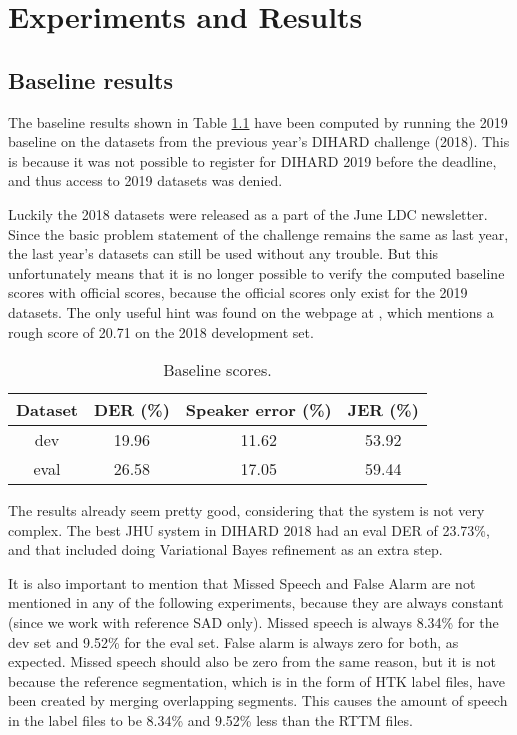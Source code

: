 \chapter{Experiments and Results}

	\section{Baseline results}
	The baseline results shown in Table \ref{table-baseline-scores} have been computed by running the 2019 baseline on the datasets from the previous year's DIHARD challenge (2018). This is because it was not possible to register for DIHARD 2019 before the deadline, and thus access to 2019 datasets was denied.
	
	Luckily the 2018 datasets were released as a part of the June LDC newsletter. Since the basic problem statement of the challenge remains the same as last year, the last year's datasets can still be used without any trouble. But this unfortunately means that it is no longer possible to verify the computed baseline scores with official scores, because the official scores only exist for the 2019 datasets. The only useful hint was found on the webpage at \cite{dihard2-unofficial}, which mentions a rough score of 20.71 on the 2018 development set.
	
	\begin{table}[h]
		\centering
		\begin{tabular}{|c|c|c|c|}
			\hline
			Dataset & DER (\%) & Speaker error (\%) & JER (\%) \\
			\hline
			dev & 19.96 & 11.62 & 53.92 \\
			\hline
			eval & 26.58 & 17.05 & 59.44 \\
			\hline
		\end{tabular}
	\caption{Baseline scores.}
	\label{table-baseline-scores}
	\end{table}
	
	The results already seem pretty good, considering that the system is not very complex. The best JHU system in DIHARD 2018 had an eval DER of 23.73\%, and that included doing Variational Bayes refinement as an extra step.

	It is also important to mention that Missed Speech and False Alarm are not mentioned in any of the following experiments, because they are always constant (since we work with reference SAD only). Missed speech is always 8.34\% for the dev set and 9.52\% for the eval set. False alarm is always zero for both, as expected. Missed speech should also be zero from the same reason, but it is not because the reference segmentation, which is in the form of HTK label files, have been created by merging overlapping segments. This causes the amount of speech in the label files to be 8.34\% and 9.52\% less than the RTTM files.
		
